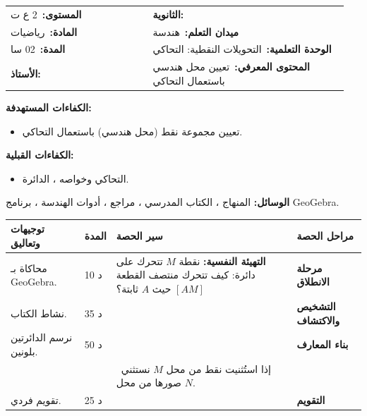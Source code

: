 \documentclass[12pt,a4paper]{article}
\makeatletter
\newenvironment{LTR}{\begin{otherlanguage}{english}}{\end{otherlanguage}}
\newcommand{\ar}[1]{\foreignlanguage{arabic}{#1}}
\newcommand{\Phase}[1]{\textbf{#1}}
\newcommand{\Fld}[2]{\textbf{#1:}\ #2}
\newcommand{\ModhHead}[9]{%
\begin{LTR}
\begin{tcolorbox}[enhanced,colback=white,colframe=cThm!85!black,arc=4mm,boxrule=1pt,top=14pt,bottom=6pt,left=8pt,right=8pt,
 overlay={\node[fill=cThm!85!black,text=white,rounded corners=3mm,inner xsep=14pt,inner ysep=4pt,font=\large\bfseries] at ([yshift=0pt]frame.north){\ar{مذكرة رقم #1}};},
 before upper={\selectlanguage{arabic}}]
\begin{tabular}{@{}p{0.4\linewidth}p{0.55\linewidth}@{}}
\Fld{المستوى}{#2} & \Fld{الثانوية}{\dotfill}\\[3pt]
\Fld{المادة}{رياضيات} & \Fld{ميدان التعلم}{#3}\\[3pt]
\Fld{المدة}{#5} & \Fld{الوحدة التعلمية}{#4}\\[3pt]
\Fld{الأستاذ}{\dotfill} & \Fld{المحتوى المعرفي}{#6}\\
\end{tabular}
\end{tcolorbox}
\begin{tcolorbox}[enhanced,colback=white,colframe=cThm!85!black,arc=3mm,boxrule=0.8pt,sidebyside,sidebyside align=top,lefthand ratio=0.5,
 segmentation style={dashed,cThm!60},before upper={\selectlanguage{arabic}},before lower={\selectlanguage{arabic}}]
\textbf{الكفاءات المستهدفة:}\par #8
\tcblower
\textbf{الكفاءات القبلية:}\par #7
\end{tcolorbox}
\end{LTR}
\par\smallskip\textbf{الوسائل:} #9\par\smallskip}
\newenvironment{Sayr}{%
\begin{LTR}\renewcommand{\arraystretch}{1.25}
\begin{longtable}{|p{0.17\textwidth}|>{\centering\arraybackslash}p{0.06\textwidth}|p{0.53\textwidth}|>{\centering\arraybackslash}p{0.12\textwidth}|}
\hline\rowcolor{cThm!12}\ar{\textbf{توجيهات وتعاليق}} & \ar{\textbf{المدة}} & \ar{\textbf{سير الحصة}} & \ar{\textbf{مراحل الحصة}}\\\hline\endhead
\hline\endfoot}{\end{longtable}\end{LTR}}
\newcommand{\Row}[4]{\ar{\small #4} & \ar{#3} & \ar{#2} & \cellcolor{cThm!8}\ar{\Phase{#1}}\\\hline}
\newcommand{\Lab}[2]{\foreignlanguage{english}{\tcbox[on line,colback=#1,colframe=#1,boxrule=0pt,arc=2pt,boxsep=1pt,left=5pt,right=5pt,top=1pt,bottom=1pt]{\ar{\textcolor{white}{\textbf{#2}}}}}}
\newcommand{\ck}{\ensuremath{{\color{cRem}\checkmark}}}
\makeatother
\begin{document}
\newpage
\ModhHead{46}{2 ع ت}{هندسة}{التحويلات النقطية: التحاكي}{02 سا}{تعيين محل هندسي باستعمال التحاكي}%
{\begin{itemize}\item التحاكي وخواصه ، الدائرة.\end{itemize}}%
{\begin{itemize}\item تعيين مجموعة نقط (محل هندسي) باستعمال التحاكي.\end{itemize}}%
{المنهاج ، الكتاب المدرسي ، مراجع ، أدوات الهندسة ، برنامج GeoGebra.}
\begin{Sayr}
\Row{مرحلة الانطلاق}{%
\textbf{التهيئة النفسية:} نقطة $M$ تتحرك على دائرة: كيف تتحرك منتصف القطعة $[AM]$ حيث $A$ ثابتة؟}{10 د}{محاكاة بـ GeoGebra.}
\Row{التشخيص والاكتشاف}{%
\Lab{cEx}{مناقشة نشاط 04 صفحة 313}\par\ck\ $M$ تمسح دائرة $(C)$ ، والنقطة $N$ مرتبطة بـ $M$ بعلاقة $\overrightarrow{IN}=k\overrightarrow{IM}$.\par
\ck\ نستنتج أن $N$ تمسح دائرة صورة $(C)$ بالتحاكي.\par
}{35 د}{نشاط الكتاب.}
\Row{بناء المعارف}{%
\Lab{cMeth}{طريقة}\ نكتب علاقة شعاعية $\overrightarrow{IN}=k\overrightarrow{IM}$ مع $I$ ثابتة ، فتكون $N$ صورة $M$ بالتحاكي $h(I;k)$ ؛ ومحل $N$ صورة محل $M$.\par\Lab{cEx}{مثال}\ $(C)$ دائرة مركزها $O$ ونصف قطرها $r$ ، $I$ نقطة ثابتة ، و $N$ منتصف $[IM]$ حيث $M\in(C)$.\par\ck\ $\overrightarrow{IN}=\frac12\overrightarrow{IM}$: $N=h(I;\tfrac12)(M)$.\par
\ck\ محل $N$: دائرة مركزها منتصف $[IO]$ ونصف قطرها $\dfrac r2$.\par
}{50 د}{نرسم الدائرتين بلونين.}
\Row{}{%
\Lab{cThm!80!black}{حذار}\ إذا استُثنيت نقط من محل $M$ نستثني صورها من محل $N$.}{}{}
\Row{التقويم}{%
\Lab{cEx}{تطبيق}\par $[AB]$ قطعة ثابتة و $M$ تمسح دائرة مركزها $B$ ونصف قطرها $3$. $G$ مركز ثقل المثلث $ABM$. عيّن محل $G$.\par\textbf{الحل:} $I$ منتصف $[AB]$: $\overrightarrow{IG}=\frac13\overrightarrow{IM}$ ، فـ $G=h(I;\tfrac13)(M)$ ؛ محل $G$ دائرة مركزها صورة $B$ ونصف قطرها $1$ (ماعدا النقطتين المرفقتين بنقطتي تقاطع الدائرة مع $(AB)$).\par\textbf{واجب منزلي:} تمرينا 53 و 54 ، وأعمال موجهة من باب التحويلات.\par\smallskip\textbf{ملاحظات حول سير الحصة:} \dotfill}{25 د}{تقويم فردي.}
\end{Sayr}
\newpage
{}%
\end{document}
